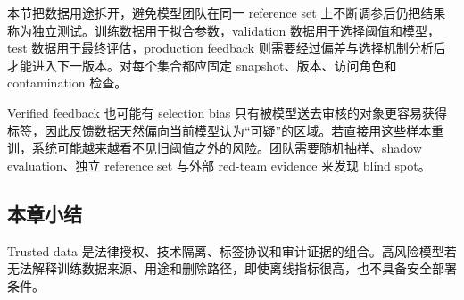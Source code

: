 本节把数据用途拆开，避免模型团队在同一 reference set 上不断调参后仍把结果称为独立测试。训练数据用于拟合参数，validation 数据用于选择阈值和模型，test 数据用于最终评估，production feedback 则需要经过偏差与选择机制分析后才能进入下一版本。对每个集合都应固定 snapshot、版本、访问角色和 contamination 检查。

\begin{warningbox}{Verified feedback 也可能有 selection bias}
只有被模型送去审核的对象更容易获得标签，因此反馈数据天然偏向当前模型认为“可疑”的区域。若直接用这些样本重训，系统可能越来越看不见旧阈值之外的风险。团队需要随机抽样、shadow evaluation、独立 reference set 与外部 red-team evidence 来发现 blind spot。
\end{warningbox}

\subsection{本章小结}

Trusted data 是法律授权、技术隔离、标签协议和审计证据的组合。高风险模型若无法解释训练数据来源、用途和删除路径，即使离线指标很高，也不具备安全部署条件。

